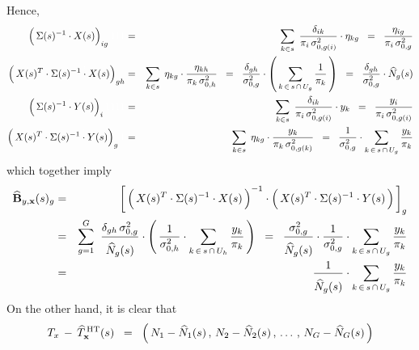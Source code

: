 Hence,
\begin{eqnarray*}
\left(\,\Sigma(s)^{-1} \overset{{\color{white}!}}{\cdot} X(s)\right)_{ig}{\color{white}111}
& = &
	\underset{k \in s}{\sum}\;\,
	\dfrac{\delta_{ik}}{\pi_{i}\,\sigma^{2}_{0,g(i)}}
	\cdot
	\eta_{kg}
\;\; = \;\;
	\dfrac{\eta_{ig}}{\pi_{i}\,\sigma^{2}_{0,g}}
\\
\left(\,X(s)^{T}\cdot\Sigma(s)^{-1} \overset{{\color{white}!}}{\cdot} X(s)\right)_{gh}
& = &
	\underset{k \in s}{\sum}\;\,
	\eta_{kg} \cdot \dfrac{\eta_{kh}}{\pi_{k}\,\sigma^{2}_{0,h}}
\;\; = \;\;
	\dfrac{\delta_{gh}}{\sigma^{2}_{0,g}}
	\cdot
	\left(\,\underset{k\,\in\,s\,\cap\,U_{g}}{\sum}\,\dfrac{1}{\pi_{k}}\,\right)
\;\; = \;\;
	\dfrac{\delta_{gh}}{\sigma^{2}_{0,g}} \cdot \widehat{N}_{g}(s)
\\
\left(\,\Sigma(s)^{-1} \overset{{\color{white}!}}{\cdot} Y(s)\right)_{i}{\color{white}1111}
& = &
	\underset{k \in s}{\sum}\;\,
	\dfrac{\delta_{ik}}{\pi_{i}\,\sigma^{2}_{0,g(i)}}
	\cdot
	y_{k}
\;\; = \;\;
	\dfrac{y_{i}}{\pi_{i}\,\sigma^{2}_{0,g(i)}}
\\
\left(\,X(s)^{T}\cdot\Sigma(s)^{-1} \overset{{\color{white}!}}{\cdot} Y(s)\right)_{g}{\color{white}1}
& = &
	\underset{k \in s}{\sum}\;\,
	\eta_{kg} \cdot \dfrac{y_{k}}{\pi_{k}\,\sigma^{2}_{0,g(k)}}
\;\; = \;\;
	\dfrac{1}{\sigma^{2}_{0,g}}
	\cdot
	\underset{k\,\in\,s\,\cap\,U_{g}}{\sum}\, \dfrac{y_{k}}{\pi_{k}}
\end{eqnarray*}
which together imply
\begin{eqnarray*}
\widehat{\mathbf{B}}_{y,\mathbf{x}}(s)_{g}
& = &
	\left[\,
		\left(\,X(s)^{T} \overset{{\color{white}!}}{\cdot} \Sigma(s)^{-1} \cdot X(s)\,\right)^{-1}
		\cdot
		\left(\,X(s)^{T} \overset{{\color{white}!}}{\cdot} \Sigma(s)^{-1} \cdot Y(s) \,\right)
	\,\right]_{g}
\\
& = &
	\overset{G}{\underset{g=1}{\sum}}\;\;
	\dfrac{\delta_{gh}\,\sigma^{2}_{0,g}}{\overset{{\color{white}.}}{\widehat{N}_{g}(s)}}
	\cdot
	\left(\,
		\dfrac{1}{\sigma^{2}_{0,h}}
		\cdot
		\underset{k\,\in\,s\,\cap\,U_{h}}{\sum}\, \dfrac{y_{k}}{\pi_{k}}
	\,\right)
\;\; = \;\;
	\dfrac{\sigma^{2}_{0,g}}{\overset{{\color{white}.}}{\widehat{N}_{g}(s)}}
	\cdot
	\dfrac{1}{\sigma^{2}_{0,g}}
	\cdot
	\underset{k\,\in\,s\,\cap\,U_{g}}{\sum}\, \dfrac{y_{k}}{\pi_{k}}
\\
& = &
	\dfrac{1}{\overset{{\color{white}.}}{\widehat{N}_{g}(s)}}
	\cdot
	\underset{k\,\in\,s\,\cap\,U_{g}}{\sum}\, \dfrac{y_{k}}{\pi_{k}}
\end{eqnarray*}
On the other hand, it is clear that
\begin{equation*}
T_{x} \,-\, \widehat{T}^{\,\textnormal{HT}}_{\mathbf{x}}(s)
\;\; = \;\;
	\left(\, N_{1} - \widehat{N}_{1}(s) \,,\, N_{2} - \widehat{N}_{2}(s) \,,\, \ldots \,,\, N_{G} - \widehat{N}_{G}(s) \,\right)
\end{equation*}
